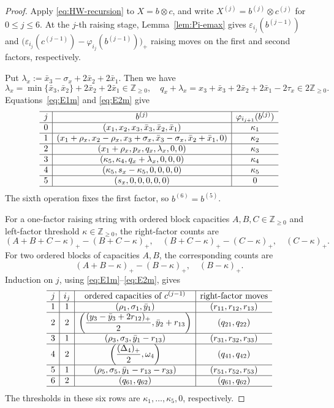 \documentclass[11pt,reqno]{amsart}
\newcommand{\Zge}{\mathbb Z_{\ge 0}}
\numberwithin{table}{section}
\numberwithin{equation}{section}
\theoremstyle{plain}
\theoremstyle{definition}
\begin{document}
\begin{proof}
	Apply \eqref{eq:HW-recursion} to \(X=b\otimes c\), and write
	\(X^{(j)}=b^{(j)}\otimes c^{(j)}\) for \(0\le j\le6\).
	At the \(j\)-th raising stage, Lemma~\ref{lem:Pi-emax} gives
	\(\varepsilon_{i_j}(b^{(j-1)})\) and $\bigl(
	\varepsilon_{i_j}(c^{(j-1)})
	-
	\varphi_{i_j}(b^{(j-1)})
	\bigr)_+$
	raising moves on the first and second factors, respectively.
	
	Put
	\(\lambda_x:=\bar x_3-\sigma_x+2\bar x_2+2\bar x_1\).
	Then we have
	\[
		\lambda_x
		=\min\{\bar x_3,\bar x_2\}+2\bar x_2+2\bar x_1
		\in\Zge,\quad
		q_x+\lambda_x
		=x_3+\bar x_3+2\bar x_2+2\bar x_1-2\tau_x
		\in2\Zge.
	\]
	Equations~\eqref{eq:E1m} and \eqref{eq:E2m} give
	\[
	\begin{array}{c|c|c}\hline
		j&b^{(j)}
		&\varphi_{i_{j+1}}(b^{(j)})\\ \hline
		0&
		(x_1,x_2,x_3,\bar x_3,\bar x_2,\bar x_1)
		&\kappa_1\\ \hline
		1&
		(x_1+\rho_x,x_2-\rho_x,x_3+\sigma_x,
		\bar x_3-\sigma_x,\bar x_2+\bar x_1,0)
		&\kappa_2\\ \hline
		2&
		(x_1+\rho_x,p_x,q_x,\lambda_x,0,0)
		&\kappa_3\\ \hline
		3&
		(\kappa_5,\kappa_4,q_x+\lambda_x,0,0,0)
		&\kappa_4\\ \hline
		4&
		(\kappa_5,s_x-\kappa_5,0,0,0,0)
		&\kappa_5\\ \hline
		5&
		(s_x,0,0,0,0,0)
		&0\\ \hline
	\end{array}
	\]
	The sixth operation fixes the first factor, so
	\(b^{(6)}=b^{(5)}\).
	
	For a one-factor raising string with ordered block capacities
	\(A,B,C\in\Zge\) and left-factor threshold \(\kappa\in\Zge\),
	the right-factor counts are
	\[
	(A+B+C-\kappa)_+-(B+C-\kappa)_+,\quad
	(B+C-\kappa)_+-(C-\kappa)_+,\quad
	(C-\kappa)_+.
	\]
	For two ordered blocks of capacities \(A,B\), the corresponding
	counts are
	\[
	(A+B-\kappa)_+-(B-\kappa)_+,
	\quad
	(B-\kappa)_+.
	\]
	Induction on \(j\), using \eqref{eq:E1m}--\eqref{eq:E2m}, gives
	\[
	\begin{array}{c|c|c|c}\hline
		j&i_j&
		\text{ordered capacities of }c^{(j-1)}
		&\text{right-factor moves}\\ \hline
		1&1&
		(\rho_1,\sigma_1,\bar y_1)
		&(r_{11},r_{12},r_{13})\\ \hline
		2&2&
		\left(
		\dfrac{(y_3-\bar y_3+2r_{12})_+}{2},
		\bar y_2+r_{13}
		\right)
		&(q_{21},q_{22})\\ \hline
		3&1&
		(\rho_3,\sigma_3,\bar y_1-r_{13})
		&(r_{31},r_{32},r_{33})\\ \hline
		4&2&
		\left(
		\dfrac{(\Delta_4)_+}{2},
		\omega_4
		\right)
		&(q_{41},q_{42})\\ \hline
		5&1&
		(\rho_5,\sigma_5,\bar y_1-r_{13}-r_{33})
		&(r_{51},r_{52},r_{53})\\ \hline
		6&2&
		(q_{61},q_{62})
		&(q_{61},q_{62})\\ \hline
	\end{array}
	\]
	The thresholds in these six rows are
	\(\kappa_1,\ldots,\kappa_5,0\), respectively.
	

\end{proof}
\end{document}
